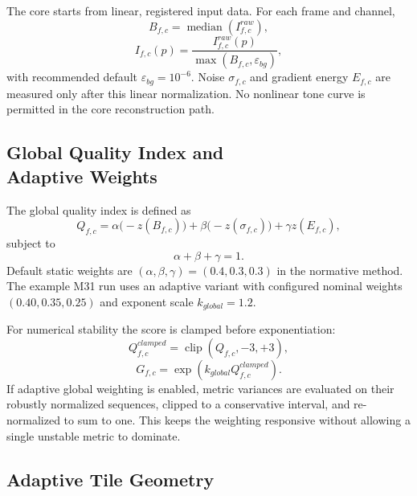 \documentclass[10pt,twocolumn]{article}
\begin{document}
The core starts from linear, registered input data. For each frame and channel,
\begin{equation}
  B_{f,c} = \operatorname{median}(I_{f,c}^{raw}),
\end{equation}
\begin{equation}
  I_{f,c}(p) = \frac{I_{f,c}^{raw}(p)}{\max(B_{f,c}, \varepsilon_{bg})},
\end{equation}
with recommended default $\varepsilon_{bg}=10^{-6}$. Noise $\sigma_{f,c}$ and gradient energy $E_{f,c}$ are measured only after this linear normalization. No nonlinear tone curve is permitted in the core reconstruction path.

\subsection{Global Quality Index and \protect \\Adaptive Weights}

The global quality index is defined as
\begin{equation}
  Q_{f,c} =
  \alpha\bigl(-z(B_{f,c})\bigr) +
  \beta\bigl(-z(\sigma_{f,c})\bigr) +
  \gamma z(E_{f,c}),
\end{equation}
subject to
\begin{equation}
  \alpha + \beta + \gamma = 1.
\end{equation}
Default static weights are $(\alpha,\beta,\gamma)=(0.4,0.3,0.3)$ in the normative method. The example M31 run uses an adaptive variant with configured nominal weights $(0.40, 0.35, 0.25)$ and exponent scale $k_{global}=1.2$.

For numerical stability the score is clamped before exponentiation:
\begin{equation}
  Q_{f,c}^{clamped} = \operatorname{clip}(Q_{f,c}, -3, +3),
\end{equation}
\begin{equation}
  G_{f,c} = \exp(k_{global} Q_{f,c}^{clamped}).
\end{equation}
If adaptive global weighting is enabled, metric variances are evaluated on their robustly normalized sequences, clipped to a conservative interval, and re-normalized to sum to one. This keeps the weighting responsive without allowing a single unstable metric to dominate.

\subsection{Adaptive Tile Geometry}
\end{document}
